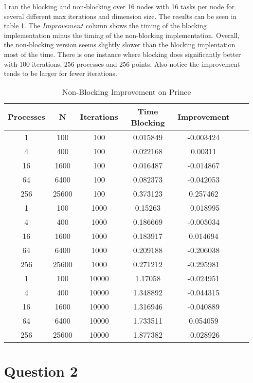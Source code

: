\documentclass[10pt]{article}
\begin{document}
I ran the blocking and non-blocking over 16 nodes with 16 tasks per node for several different max iterations and dimension size. The results can be seen in table \ref{tab1}. The $\textit{Improvement}$ column shows the timing of the blocking implementation minus the timing of the non-blocking implementation. Overall, the non-blocking version seems slightly slower than the blocking implentation most of the time. There is one instance where blocking does significantly better with 100 iterations, 256 processes and 256 points. Also notice the improvement tends to be larger for fewer iterations.

\begin{table}[h!]
\centering
\begin{tabular}{ |c|c|c|c|c|c|c| }
\hline
Processes&	N&	Iterations&	Time Blocking&	Improvement\\
\hline
1&	100&	100&	0.015849&	-0.003424\\
4&	400&	100&	0.022168&	0.00311\\
16&	1600&	100&	0.016487&	-0.014867\\
64&	6400&	100&	0.082373&	-0.042053\\
256&	25600&	100&	0.373123&	0.257462\\
1&	100&	1000&	0.15263&	-0.018995\\
4&	400&	1000&	0.186669&	-0.005034\\
16&	1600&	1000&	0.183917&	0.014694\\
64&	6400&	1000&	0.209188&	-0.206038\\
256&	25600&	1000&	0.271212&	-0.295981\\
1&	100&	10000&	1.17058&	-0.024951\\
4&	400&	10000&	1.348892&	-0.044315\\
16&	1600&	10000&	1.316946&	-0.040889\\
64&	6400&	10000&	1.733511&	0.054059\\
256&	25600&	10000&	1.877382&	-0.028926\\
\hline
\end{tabular}
 \caption{Non-Blocking Improvement on Prince}
 \label{tab1}
 \end{table}

\newpage

\section{Question 2}
\end{document}
